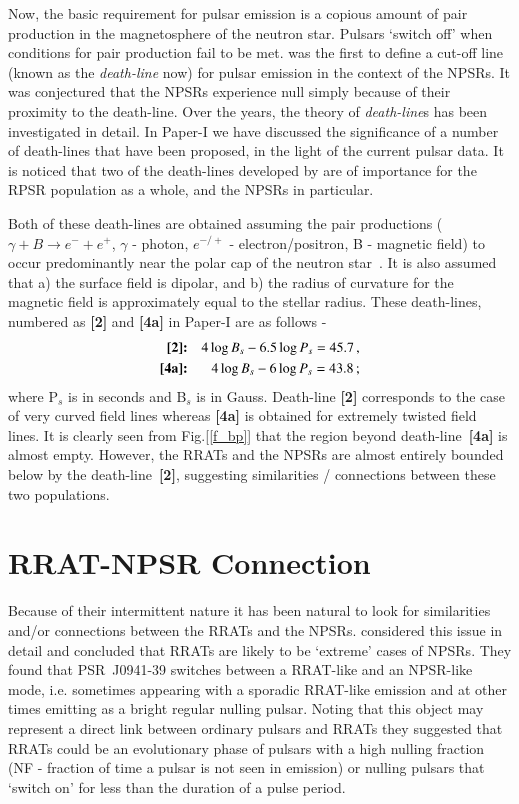 \documentclass{jaa}
\newcommand{\ber}{\begin{eqnarray}}
\newcommand{\eer}{\end{eqnarray}}
\begin{document}
Now, the basic requirement for pulsar  emission is a copious amount of
pair production  in the  magnetosphere of  the neutron  star.  Pulsars
`switch  off'  when   conditions  for  pair  production   fail  to  be
met.  was the first to  define a cut-off line (known as
the {\em  death-line} now) for pulsar  emission in the context  of the
NPSRs.   It was  conjectured  that the  NPSRs  experience null  simply
because of  their proximity  to the death-line.   Over the  years, the
theory  of  {\em death-line}s  has  been  investigated in  detail.  In
Paper-I we have discussed the  significance of a number of death-lines
that have been  proposed, in the light of the  current pulsar data. It
is noticed  that two of  the death-lines developed  by 
are of importance for the RPSR population as a whole, and the NPSRs in
particular.

Both of these  death-lines are obtained assuming  the pair productions
($\gamma +  B \rightarrow e^- +  e^+$, $\gamma$ - photon,  $e^{-/+}$ -
electron/positron, B - magnetic field) to occur predominantly near the
polar cap of the neutron  star~\cite{ruder75}. It is also assumed that
a) the  surface field is dipolar,  and b) the radius  of curvature for
the  magnetic field  is  approximately equal  to  the stellar  radius.
These death-lines, numbered as {\bf [2]} and {\bf [4a]} in Paper-I are
as follows -
%
\ber
%
\mbox{\bf [2]} &\mbox{\bf :}& 4 \log B_s - 6.5 \log P_s = 45.7 \,, \\
\label{eq-dl2}
%
\mbox{\bf [4a]} &\mbox{\bf :}& 4 \log B_s - 6 \log P_s = 43.8 \,;
\label{eq-dl4a}
%
\eer
%
where P$_s$ is in seconds and  B$_s$ is in Gauss. Death-line {\bf [2]}
corresponds to the case of very  curved field lines whereas {\bf [4a]}
is obtained for extremely twisted field lines. It is clearly seen from
Fig.[\ref{f_bp}]  that  the  region beyond  death-line~{\bf  [4a]}  is
almost empty.  However, the  RRATs and the  NPSRs are  almost entirely
bounded below  by the  death-line~{\bf[2]}, suggesting  similarities /
connections between these two populations.

\section{RRAT-NPSR Connection}
% 
Because of their  intermittent nature it has been natural  to look for
similarities   and/or   connections   between  the   RRATs   and   the
NPSRs.   considered this issue in  detail and concluded
that RRATs are likely to be  `extreme' cases of NPSRs. They found that
PSR~J0941-39 switches between a RRAT-like  and an NPSR-like mode, i.e.
sometimes appearing  with a sporadic  RRAT-like emission and  at other
times emitting  as a bright  regular nulling pulsar. Noting  that this
object may represent a direct  link between ordinary pulsars and RRATs
they suggested  that RRATs could  be an evolutionary phase  of pulsars
with a high  nulling fraction (NF -  fraction of time a  pulsar is not
seen in  emission) or nulling pulsars  that `switch on' for  less than
the duration of a pulse period.
\end{document}
